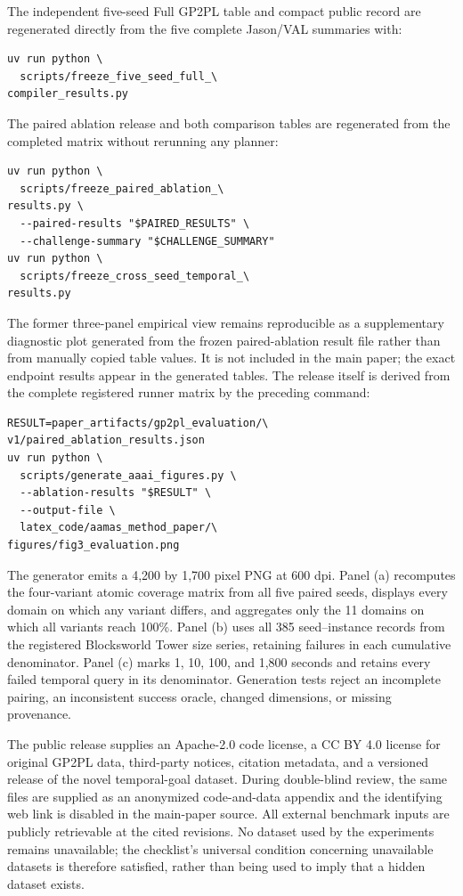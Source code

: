 The independent five-seed Full GP2PL table and compact public record are
regenerated directly from the five complete Jason/VAL summaries with:

\begingroup
\small
\begin{verbatim}
uv run python \
  scripts/freeze_five_seed_full_\
compiler_results.py
\end{verbatim}
\endgroup

The paired ablation release and both comparison tables are regenerated from the
completed matrix without rerunning any planner:

\begingroup
\small
\begin{verbatim}
uv run python \
  scripts/freeze_paired_ablation_\
results.py \
  --paired-results "$PAIRED_RESULTS" \
  --challenge-summary "$CHALLENGE_SUMMARY"
uv run python \
  scripts/freeze_cross_seed_temporal_\
results.py
\end{verbatim}
\endgroup

The former three-panel empirical view remains reproducible as a supplementary
diagnostic plot generated from the frozen paired-ablation result file rather
than from manually copied table values. It is not included in the main paper;
the exact endpoint results appear in the generated tables. The release itself
is derived from the complete registered runner matrix by the preceding command:

\begingroup
\small
\begin{verbatim}
RESULT=paper_artifacts/gp2pl_evaluation/\
v1/paired_ablation_results.json
uv run python \
  scripts/generate_aaai_figures.py \
  --ablation-results "$RESULT" \
  --output-file \
  latex_code/aamas_method_paper/\
figures/fig3_evaluation.png
\end{verbatim}
\endgroup

The generator emits a 4,200 by 1,700 pixel PNG at 600 dpi. Panel (a) recomputes
the four-variant atomic coverage matrix
from all five paired seeds, displays every domain on which any variant differs,
and aggregates only the 11 domains on which all variants reach 100\%. Panel (b)
uses all 385 seed--instance records from the registered Blocksworld Tower size
series, retaining failures in each cumulative denominator. Panel (c) marks 1,
10, 100, and 1,800 seconds and retains every failed temporal query in its
denominator. Generation tests reject an incomplete pairing, an inconsistent
success oracle, changed dimensions, or missing provenance.

The public release supplies an Apache-2.0 code license, a CC BY 4.0 license for
original GP2PL data, third-party notices, citation metadata, and a versioned
release of the novel temporal-goal dataset. During double-blind review, the same
files are supplied as an anonymized code-and-data appendix and the identifying
web link is disabled in the main-paper source. All external benchmark inputs are
publicly retrievable at the cited revisions. No dataset used by the experiments
remains unavailable; the checklist's universal condition concerning unavailable
datasets is therefore satisfied, rather than being used to imply that a hidden
dataset exists.

